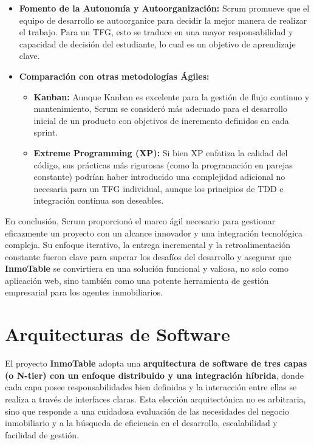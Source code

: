 \begin{itemize}
    \item \textbf{Fomento de la Autonomía y Autoorganización:} Scrum promueve que el equipo de desarrollo se autoorganice para decidir la mejor manera de realizar el trabajo. Para un TFG, esto se traduce en una mayor responsabilidad y capacidad de decisión del estudiante, lo cual es un objetivo de aprendizaje clave.
    \item \textbf{Comparación con otras metodologías Ágiles:} 
    \begin{itemize}
        \item \textbf{Kanban:} Aunque Kanban es excelente para la gestión de flujo continuo y mantenimiento, Scrum se consideró más adecuado para el desarrollo inicial de un producto con objetivos de incremento definidos en cada sprint.
        \item \textbf{Extreme Programming (XP):} Si bien XP enfatiza la calidad del código, sus prácticas más rigurosas (como la programación en parejas constante) podrían haber introducido una complejidad adicional no necesaria para un TFG individual, aunque los principios de TDD e integración continua son deseables.
    \end{itemize}
\end{itemize}

En conclusión, Scrum proporcionó el marco ágil necesario para gestionar eficazmente un proyecto con un alcance innovador y una integración tecnológica compleja. Su enfoque iterativo, la entrega incremental y la retroalimentación constante fueron clave para superar los desafíos del desarrollo y asegurar que \textbf{InmoTable} se convirtiera en una solución funcional y valiosa, no solo como aplicación web, sino también como una potente herramienta de gestión empresarial para los agentes inmobiliarios.


\section{Arquitecturas de Software}


El proyecto \textbf{InmoTable} adopta una \textbf{arquitectura de software de tres capas (o N-tier) con un enfoque distribuido y una integración híbrida}, donde cada capa posee responsabilidades bien definidas y la interacción entre ellas se realiza a través de interfaces claras. Esta elección arquitectónica no es arbitraria, sino que responde a una cuidadosa evaluación de las necesidades del negocio inmobiliario y a la búsqueda de eficiencia en el desarrollo, escalabilidad y facilidad de gestión.

